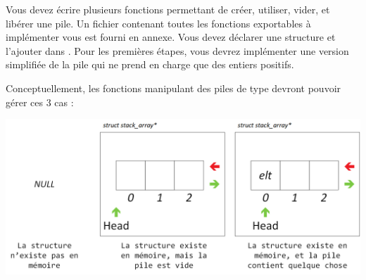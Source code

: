 

\vspace*{0.7cm}

\noindent {}

\bigskip

%

\noindent Vous devez écrire plusieurs fonctions permettant de créer, utiliser, vider, et libérer une pile.
Un fichier  contenant toutes les fonctions exportables à implémenter vous est fourni en annexe.
Vous devez déclarer une structure  et l'ajouter dans .
Pour les premières étapes, vous devrez implémenter une version simplifiée de la pile qui ne prend en charge que des entiers positifs.


\bigskip

\noindent Conceptuellement, les fonctions manipulant des piles de type  devront pouvoir gérer ces 3 cas :

\bigskip

\begin{center}
\includegraphics[scale=0.85]{Cours/Piles_Implementation_ARRAY.png}
\end{center}

\bigskip

